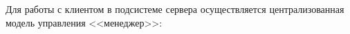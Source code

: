 Для работы с клиентом в подсистеме сервера осуществляется централизованная модель управления <<менеджер>>:

